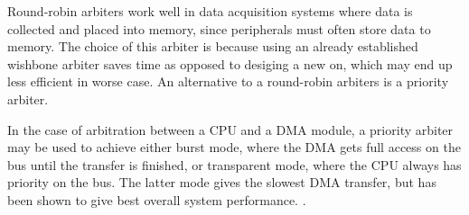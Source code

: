 Round-robin arbiters work well in data acquisition systems where data is collected and placed into memory, since peripherals must often store data to memory. %
The choice of this arbiter is because using an already established wishbone arbiter saves time as opposed to desiging a new on, which may end up less efficient in worse case.
An alternative to a round-robin arbiters is a priority arbiter.

In the case of arbitration between a CPU and a DMA module, a priority arbiter may be used to achieve either burst mode, where the DMA gets full access on the bus until the transfer is finished, or transparent mode, where the CPU always has priority on the bus.
The latter mode gives the slowest DMA transfer, but has been shown to give best overall system performance.  \cite{DMA-lecture}.

